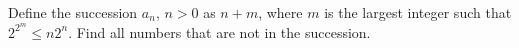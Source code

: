 Define the succession $ a_{n}$,  $ n>0$ as $ n+m$,  where $ m$ is the largest integer such that $ 2^{2^{m}}\leq n2^{n}$. Find all numbers that are not in the succession.